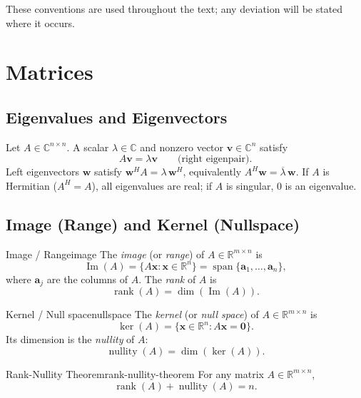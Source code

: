 These conventions are used throughout the text; any deviation will be stated where it occurs.

\section{Matrices}
\label{sec:matrices}

\subsection{Eigenvalues and Eigenvectors}
\label{subsec:eigs}
Let $A\in\mathbb{C}^{n\times n}$. A scalar $\lambda\in\mathbb{C}$ and nonzero vector $\mathbf{v}\in\mathbb{C}^n$ satisfy
\[
    A\mathbf{v}=\lambda\mathbf{v}\qquad\text{(right eigenpair)}.
\]
Left eigenvectors $\mathbf{w}$ satisfy $\mathbf{w}^H A = \lambda \, \mathbf{w}^H$, equivalently $A^H\mathbf{w}=\overline{\lambda}\,\mathbf{w}$. If $A$ is Hermitian ($A^H=A$), all eigenvalues are real; if $A$ is singular, $0$ is an eigenvalue.

\subsection{Image (Range) and Kernel (Nullspace)}
\label{subsec:image-kernel}

\begin{definition}{Image / Range}{image}
    The \emph{image} (or \emph{range}) of $A\in\mathbb{R}^{m\times n}$ is
    \[
        \operatorname{Im}(A)=\{A\mathbf{x}:\mathbf{x}\in\mathbb{R}^n\} =\operatorname{span}\{\mathbf{a}_1,\dots,\mathbf{a}_n\},
    \]
    where $\mathbf{a}_j$ are the columns of $A$. The \emph{rank} of $A$ is
    \[
        \operatorname{rank}(A)=\dim(\operatorname{Im}(A)).
    \]
\end{definition}

\begin{definition}{Kernel / Null space}{nullspace}
    The \emph{kernel} (or \emph{null space}) of $A\in\mathbb{R}^{m\times n}$ is
    \[
        \ker(A)=\{\mathbf{x}\in\mathbb{R}^n: A\mathbf{x}=\mathbf{0}\}.
    \]
    Its dimension is the \emph{nullity} of $A$:
    \[
        \operatorname{nullity}(A)=\dim(\ker(A)).
    \]
\end{definition}

\begin{theorem}{Rank-Nullity Theorem}{rank-nullity-theorem}
    For any matrix $A\in\mathbb{R}^{m\times n}$,
    \[
        \operatorname{rank}(A)+\operatorname{nullity}(A)=n.
    \]
\end{theorem}

